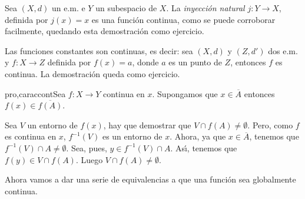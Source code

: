 \begin{ejemplo}{} Sea $(X,d)$ un e.m. e $Y$ un subespacio de $X$. La
\emph{inyección natural} $j:Y\rightarrow X$, definida por
$j(x)=x$ es una función continua, como se puede corroborar
facilmente, quedando esta demostración como ejercicio.
\end{ejemplo}

\begin{ejemplo}{} Las funciones constantes son continuas, es decir:
sea $(X,d)$ y $(Z,d')$ dos e.m. y $f:X\rightarrow Z$ definida por
$f(x)=a$, donde $a$ es un punto de $Z$, entonces $f$ es continua.
La demostración queda como ejercicio.
\end{ejemplo}

\begin{proposicion}{pro,caraccont}Sea $f:X\rightarrow Y$ continua en $x$. Supongamos que $x\in
\overline{A}$ entonces $f(x)\in\overline{f(A)}$.
\end{proposicion}

\begin{demo} Sea $V$ un entorno de $f(x)$, hay que demostrar que
$V\cap f(A)\neq\emptyset$. Pero, como $f$ es continua en $x$,
$f^{-1}(V)$ es un entorno de $x$. Ahora, ya que
$x\in\overline{A}$, tenemos que $f^{-1}(V)\cap A\neq\emptyset$.
Sea, pues, $y\in f^{-1}(V)\cap A$. As\'{\i}, tenemos que $f(y)\in
V\cap f(A)$. Luego $V\cap f(A)\neq\emptyset$.
\end{demo}

Ahora vamos a dar una serie de equivalencias a que una función
sea globalmente continua.

